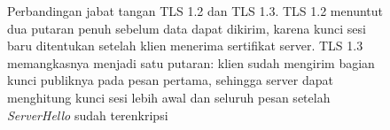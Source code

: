 \begin{figure}[htbp]
\begin{tikzpicture}
    \end{tikzpicture}
    \caption{Perbandingan jabat tangan TLS 1.2 dan TLS 1.3. TLS 1.2 menuntut
    dua putaran penuh sebelum data dapat dikirim, karena kunci sesi baru
    ditentukan setelah klien menerima sertifikat server. TLS 1.3 memangkasnya
    menjadi satu putaran: klien sudah mengirim bagian kunci publiknya pada
    pesan pertama, sehingga server dapat menghitung kunci sesi lebih awal dan
    seluruh pesan setelah \textit{ServerHello} sudah terenkripsi}
    \label{fig:jabat-tangan-tls}
\end{figure}

